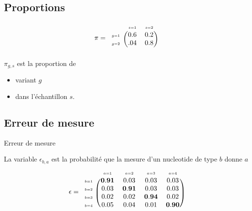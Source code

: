 \documentclass{beamer}
\newcommand{\fr}[1]{#1}
\newcommand{\en}[1]{}
\begin{document}
\subsection{Proportions}
\begin{frame}
        $$\pi=\begin{blockarray}{ccc}
    &\scriptscriptstyle s=1&\scriptscriptstyle s=2\\
    \begin{block}{c(cc)}
 {\scriptscriptstyle g=1}&0.6&0.2\\   
 {\scriptscriptstyle 
 g=2}&.04&0.8\\   
    \end{block}
\end{blockarray} $$
$\pi_{g,s}$ est la proportion de
 \begin{itemize}
    \item variant $g$
    \item dans l'échantillon $s$.
\end{itemize}
\end{frame}

\subsection{\en{Measurement errors}\fr{Erreur de mesure}}
\begin{frame}{\en{Measurement errors}\fr{Erreur de mesure}}
\en{The variable $\epsilon_{b,a}$ is the probability that the measurment of a nucleotide of type $b$ reads $a$}
\fr{La variable $\epsilon_{b,a}$ est la probabilité que la mesure d'un nucleotide de type $b$ donne  $a$}
  $$\epsilon=\begin{blockarray}{ccccc}
    &\scriptscriptstyle a=1&\scriptscriptstyle a=2&\scriptscriptstyle a=3&\scriptscriptstyle a=4\\
    \begin{block}{c(cccc)}
 {\scriptscriptstyle b=1}&\mathbf{0.91}&0.03&0.03&0.03\\   
 {\scriptscriptstyle 
 b=2}&0.03&\mathbf{0.91}&0.03&0.03\\   
  {\scriptscriptstyle 
 b=3}&0.02&0.02&\mathbf{0.94}&0.02\\   
  {\scriptscriptstyle 
 b=4}&0.05&0.04&0.01&\mathbf{0.90}\\   
    \end{block}
\end{blockarray} $$


\end{frame}
\end{document}
